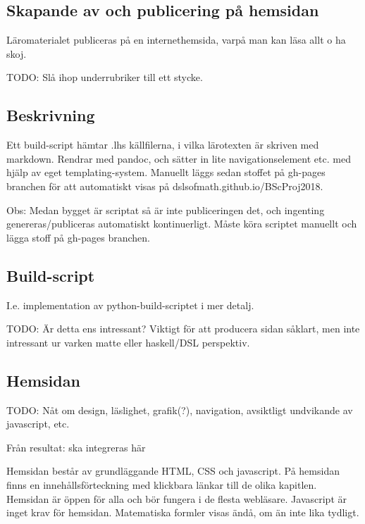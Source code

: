 \begin{binge}

\section{Skapande av och publicering på hemsidan}

  Läromaterialet publiceras på en internethemsida, varpå man kan läsa
  allt o ha skoj.

  TODO: Slå ihop underrubriker till ett stycke.

  \subsection{Beskrivning}

  Ett build-script hämtar .lhs källfilerna, i vilka lärotexten är
  skriven med markdown. Rendrar med pandoc, och sätter in lite
  navigationselement etc. med hjälp av eget templating-system. Manuellt
  läggs sedan stoffet på gh-pages branchen för att automatiskt visas på
  dslsofmath.github.io/BScProj2018. 

  Obs: Medan bygget är scriptat så är inte publiceringen det, och
  ingenting genereras/publiceras automatiskt kontinuerligt. Måste köra
  scriptet manuellt och lägga stoff på gh-pages branchen.

  \subsection{Build-script}

  I.e. implementation av python-build-scriptet i mer detalj.

  TODO: Är detta ens intressant? Viktigt för att producera sidan såklart, men
  inte intressant ur varken matte eller haskell/DSL perspektiv.

  \subsection{Hemsidan}

  TODO: Nåt om design, läslighet, grafik(?), navigation, avsiktligt undvikande
  av javascript, etc.

Från resultat: ska integreras här

Hemsidan består av grundläggande HTML, CSS och javascript. På hemsidan finns en innehållsförteckning med klickbara länkar till de olika kapitlen. Hemsidan är öppen för alla och bör fungera i de flesta webläsare. Javascript är inget krav för hemsidan. Matematiska formler visas ändå, om än inte lika tydligt.

\end{binge}
